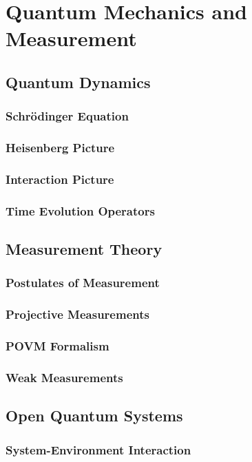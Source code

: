 \documentclass[12pt,a4paper]{book}
\begin{document}
\chapter{Quantum Mechanics and Measurement}

\section{Quantum Dynamics}
\subsection{Schrödinger Equation}
\subsection{Heisenberg Picture}
\subsection{Interaction Picture}
\subsection{Time Evolution Operators}

\section{Measurement Theory}
\subsection{Postulates of Measurement}
\subsection{Projective Measurements}
\subsection{POVM Formalism}
\subsection{Weak Measurements}

\section{Open Quantum Systems}
\subsection{System-Environment Interaction}
\end{document}
